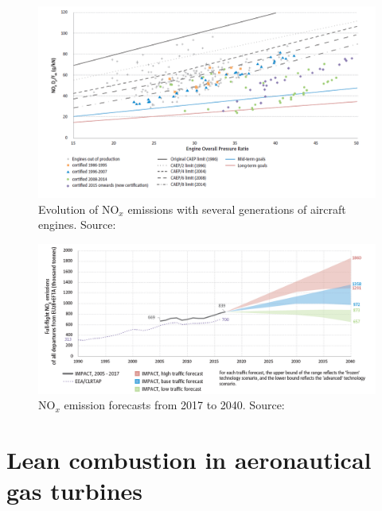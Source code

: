 \begin{figure}[h!]
	\centering
	\includegraphics[scale=0.6]{./part0_intro/NOx_emissions_with_OPR}
	\caption{Evolution of NO$_x$ emissions with several generations of aircraft engines. Source: }
	\label{fig:NOX_emissions_with_OPR}
\end{figure}

\begin{figure}[h!]
	\centering
	\includegraphics[scale=0.6]{./part0_intro/NOx_emissions_forecast_report2019}
	\caption{NO$_x$ emission forecasts from 2017 to 2040. Source: }
	\label{fig:NOX_forecasts}
\end{figure}


\section{Lean combustion in aeronautical gas turbines}



